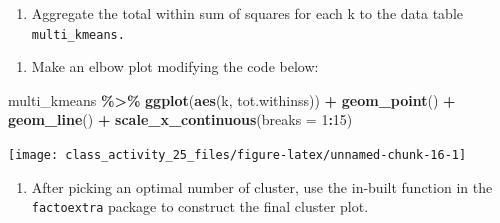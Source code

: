 \documentclass[
]{book}
\newenvironment{Shaded}{\begin{snugshade}}{\end{snugshade}}
\newcommand{\AttributeTok}[1]{\textcolor[rgb]{0.13,0.29,0.53}{#1}}
\newcommand{\DecValTok}[1]{\textcolor[rgb]{0.00,0.00,0.81}{#1}}
\newcommand{\FunctionTok}[1]{\textcolor[rgb]{0.13,0.29,0.53}{\textbf{#1}}}
\newcommand{\NormalTok}[1]{#1}
\newcommand{\OtherTok}[1]{\textcolor[rgb]{0.56,0.35,0.01}{#1}}
\newcommand{\SpecialCharTok}[1]{\textcolor[rgb]{0.81,0.36,0.00}{\textbf{#1}}}
\providecommand{\tightlist}{%
  \setlength{\itemsep}{0pt}\setlength{\parskip}{0pt}}
\begin{document}
\begin{enumerate}
\def\labelenumi{\alph{enumi}.}
\setcounter{enumi}{4}
\tightlist
\item
  Aggregate the total within sum of squares for each k to the data table \texttt{multi\_kmeans.}
\end{enumerate}

\begin{Shaded}
\end{Shaded}

\begin{enumerate}
\def\labelenumi{\alph{enumi}.}
\setcounter{enumi}{1}
\tightlist
\item
  Make an elbow plot modifying the code below:
\end{enumerate}

\begin{Shaded}
\begin{Highlighting}[]
\NormalTok{multi\_kmeans }\SpecialCharTok{\%\textgreater{}\%}
  \FunctionTok{ggplot}\NormalTok{(}\FunctionTok{aes}\NormalTok{(k, tot.withinss)) }\SpecialCharTok{+}
  \FunctionTok{geom\_point}\NormalTok{() }\SpecialCharTok{+}
  \FunctionTok{geom\_line}\NormalTok{() }\SpecialCharTok{+}
  \FunctionTok{scale\_x\_continuous}\NormalTok{(}\AttributeTok{breaks =} \DecValTok{1}\SpecialCharTok{:}\DecValTok{15}\NormalTok{)}
\end{Highlighting}
\end{Shaded}

\texttt{[image: class\_activity\_25\_files/figure-latex/unnamed-chunk-16-1]}

\begin{enumerate}
\def\labelenumi{\alph{enumi}.}
\setcounter{enumi}{6}
\tightlist
\item
  After picking an optimal number of cluster, use the in-built function in the \texttt{factoextra} package to construct the final cluster plot.
\end{enumerate}
\end{document}

